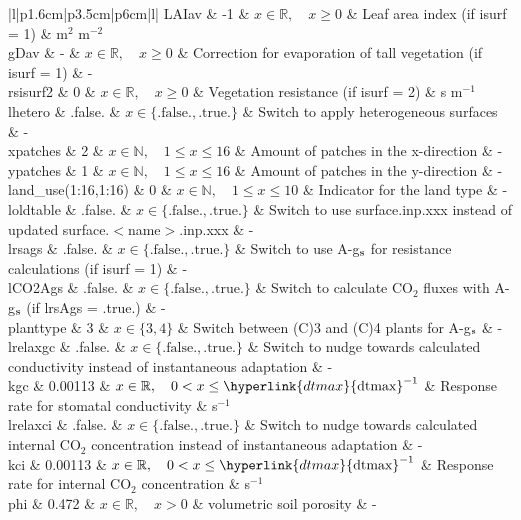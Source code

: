 \documentclass[twoside,11pt,fleqn,a4paper,english,openright]{report}
\begin{document}
\begin{center}
\begin{supertabular}{|l|p{1.6cm}|p{3.5cm}|p{6cm}|l|}
  LAIav	& -1	& $x \in \mathbb{R}, \quad x \ge 0$	& Leaf area index (if isurf = 1)	& m$^{2}$ m$^{-2}$\\
  gDav	& -	& $x \in \mathbb{R}, \quad x \ge 0$	& Correction for evaporation of tall vegetation (if isurf = 1) & -\\
  rsisurf2	& 0	& $x \in \mathbb{R}, \quad x \ge 0$	& Vegetation resistance (if isurf = 2)	& s m$^{-1}$\\
  lhetero & .false. & $x\in\{\text{.false.},\text{.true.}\}$ & Switch to apply heterogeneous surfaces & - \\
  xpatches & 2 & $x \in \mathbb{N}, \quad 1 \leq x \leq 16$ & Amount of patches in the x-direction & - \\
  ypatches & 1 & $x \in \mathbb{N}, \quad 1 \leq x \leq 16$ & Amount of patches in the y-direction & - \\
  land\_use(1:16,1:16) & 0 & $x \in \mathbb{N}, \quad 1 \leq x \leq 10$ & Indicator for the land type & - \\
  loldtable & .false. & $x\in\{\text{.false.},\text{.true.}\}$  & Switch to use surface.inp.xxx instead of updated surface.$<$name$>$.inp.xxx & - \\ 
  \hypertarget{lrsags}{lrsags}	& .false. & $x\in\{\text{.false.},\text{.true.}\}$  & Switch to use A-g$_{\rm s}$ for resistance calculations (if isurf = 1) & - \\ 
  lCO2Ags	& .false. & $x\in\{\text{.false.},\text{.true.}\}$  & Switch to calculate CO$_2$ fluxes with A-g$_{\rm s}$  (if lrsAgs = .true.) & - \\ 
  planttype & 3	& $x \in \{3, 4\}$	& Switch between (C)3 and (C)4 plants for A-g$_{\rm s}$ & - \\
  lrelaxgc	& .false. & $x\in\{\text{.false.},\text{.true.}\}$  & Switch to nudge towards calculated conductivity instead of instantaneous adaptation & - \\ 
  kgc		& 0.00113 & $x \in \mathbb{R}, \quad 0 < x \le \hyperlink{dtmax}{\text{dtmax}}^{-1}$	& Response rate for stomatal conductivity	& s$^{-1}$\\
  lrelaxci	& .false. & $x\in\{\text{.false.},\text{.true.}\}$  & Switch to nudge towards calculated internal CO$_2$ concentration instead of instantaneous adaptation & - \\ 
  kci		& 0.00113 & $x \in \mathbb{R}, \quad 0 < x \le \hyperlink{dtmax}{\text{dtmax}}^{-1}$	& Response rate for internal CO$_2$ concentration	& s$^{-1}$\\
  phi		& 0.472	& $x \in \mathbb{R}, \quad x > 0$	& volumetric soil porosity & - \\

\end{supertabular}
\end{center}
\end{document}
